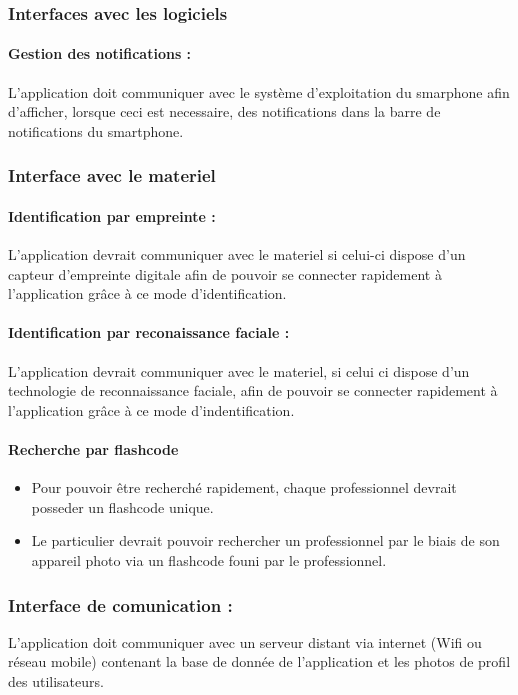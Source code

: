 \documentclass{article}
\begin{document}
\begin{itemize}
\begin{itemize}
\subsubsection{Interfaces avec les logiciels}
\paragraph{Gestion des notifications :}
L'application doit communiquer avec le système d'exploitation du
smarphone afin d'afficher, lorsque ceci est necessaire, des
notifications dans la barre de notifications du smartphone.

\subsubsection{Interface avec le materiel}
\paragraph{Identification par empreinte :}
L'application devrait communiquer avec le materiel si celui-ci dispose
d'un capteur d'empreinte digitale afin de pouvoir se connecter rapidement à
l'application grâce à ce mode d'identification.
\paragraph{Identification par reconaissance faciale :}
L'application devrait communiquer avec le materiel, si celui ci dispose
d'un technologie de reconnaissance faciale, afin de pouvoir se
connecter rapidement à l'application grâce à ce mode
d'indentification.
\paragraph{Recherche par flashcode}
\begin{itemize}
\item Pour pouvoir être recherché rapidement, chaque professionnel
  devrait posseder un flashcode unique.
\item Le particulier devrait pouvoir rechercher un professionnel par le
  biais de son appareil photo via un flashcode founi par le
  professionnel.
\end{itemize}

\subsubsection{Interface de comunication :}
L'application doit communiquer avec un serveur distant via internet
(Wifi ou réseau mobile) contenant la base de donnée de l'application et
les photos de profil des utilisateurs.



\end{itemize}
\end{itemize}
\end{document}
